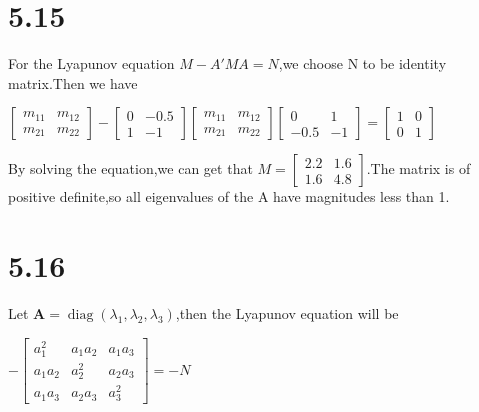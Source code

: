 \documentclass{article}
\begin{document}
\section*{5.15}

For the Lyapunov equation $M-A'MA=N$,we choose N to be identity matrix.Then we have\\
\begin{center}
    $\left[\begin{array}{ll}m_{11} & m_{12}\\m_{21} & m_{22}\end{array}\right]-\left[\begin{array}{ll}0 & -0.5\\1 & -1\end{array}\right]\left[\begin{array}{ll}m_{11} & m_{12}\\m_{21} & m_{22}\end{array}\right]\left[\begin{array}{ll}0 & 1\\-0.5 & -1\end{array}\right]=\left[\begin{array}{ll}1 & 0\\0 & 1\end{array}\right]$
\end{center}

By solving the equation,we can get that $M=\left[\begin{array}{ll}2.2 & 1.6\\1.6 & 4.8\end{array}\right]$.The matrix is of positive definite,so all eigenvalues of the A have magnitudes less than 1.\\

\section*{5.16}

Let $\mathbf{A}=\operatorname{diag}\left(\lambda_{1}, \lambda_{2}, \lambda_{3}\right)$,then the Lyapunov equation will be \\
\begin{center}
    $-\left[\begin{array}{lll}a_1^2 & a_1a_2 & a_1a_3\\a_1a_2 & a_2^2 & a_2a_3\\a_1a_3 & a_2a_3 & a_3^2\end{array}\right]=-N$
\end{center}
\end{document}
